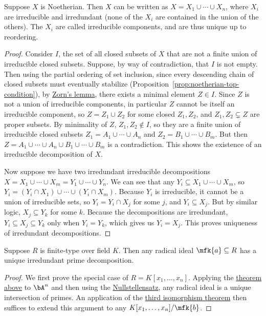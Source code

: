 \begin{theorem}\label{thm:noetherian-irr-decomp}
    Suppose \(X\) is Noetherian.
    Then \(X\) can be written as \(X = X_1 \cup \cdots \cup X_n\),
    where \(X_i\) are irreducible and irredundant (none of the \(X_i\) are contained in the union of the others).
    The \(X_i\) are called irreducible components,
    and are thus unique up to reordering.
\end{theorem}
\begin{proof}
    Consider \(I\), the set of all closed subsets of \(X\)
    that are not a finite union of irreducible closed subsets.
    Suppose, by way of contradiction, that \(I\) is not empty.
    Then using the partial ordering of set inclusion,
    since every descending chain of closed subsets must eventually stabilize
    (Proposition~\ref{prop:noetherian-top-condition}),
    by \hyperref[ax:zorn]{Zorn's lemma},
    there exists a minimal element \(Z \in I\).
    Since \(Z\) is not a union of irreducible components,
    in particular \(Z\) cannot be itself an irreducible component,
    so \(Z = Z_1 \cup Z_2\) for some closed \(Z_1,Z_2\),
    and \(Z_1,Z_2 \subsetneq Z\) are proper subsets.
    By minimality of \(Z\), \(Z_1,Z_2 \notin I\),
    so they are a finite union of irreducible closed subsets
    \(Z_1 = A_1 \cup \cdots \cup A_n\) and \(Z_2 = B_1 \cup \cdots \cup B_m\).
    But then \(Z = A_1 \cup \cdots \cup A_n \cup B_1 \cup \cdots \cup B_m\)
    is a contradiction.
    This shows the existence of an irreducible decomposition of \(X\).

    Now suppose we have two irredundant irreducible decompositions
    \(X = X_1 \cup \cdots \cup X_m = Y_1 \cup \cdots \cup Y_n\).
    We can see that any \(Y_i \subseteq X_1 \cup \cdots \cup X_m\),
    so \(Y_i = (Y_i \cap X_1) \cup \cdots \cup (Y_i \cap X_m)\).
    Because \(Y_i\) is irreducible,
    it cannot be a union of irreducible sets,
    so \(Y_i = Y_i \cap X_j\) for some \(j\), and \(Y_i \subseteq X_j\).
    But by similar logic, \(X_j \subseteq Y_k\) for some \(k\).
    Because the decompositions are irredundant,
    \(Y_i \subseteq X_j \subseteq Y_k\) only when \(Y_i = Y_k\),
    which gives us \(Y_i = X_j\).
    This proves uniqueness of irredundant decompositions.
\end{proof}
\begin{corollary}
    Suppose \(R\) is finite-type over field \(K\).
    Then any radical ideal \(\mfk{a} \subseteq R\) has a unique irredundant prime decomposition.
\end{corollary}
\begin{proof}
    We first prove the special case of \(R = K[x_1,\hdots,x_n]\).
    Applying the \hyperref[thm:noetherian-irr-decomp]{theorem above} to \(\bA^n\)
    and then using the \hyperref[thm:nullstellensatz]{Nullstellensatz},
    any radical ideal is a unique intersection of primes.
    An application of the \hyperref[thm:iso-3-ring]{third isomorphism theorem}
    then suffices to extend this argument to any \(K[x_1,\hdots,x_n]/\mfk{b}\).
\end{proof}

